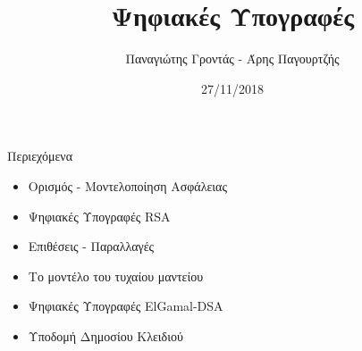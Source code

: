 \documentclass{beamer}
\title{Ψηφιακές Υπογραφές}
\author{Παναγιώτης Γροντάς - Άρης Παγουρτζής}
\date{27/11/2018}
\institute{ΕΜΠ - Κρυπτογραφία (2018-2019)}
\begin{document}
\newcommand{\xor}{ \oplus }
\newcommand{\msg}{ \mathtt{M} }
\newcommand{\KEY}{ \mathtt{K} }
\newcommand{\CPH}{ \mathtt{C} }
\newcommand{\keygen}{\mathtt{KeyGen}}
\newcommand{\enc}{\mathtt{Encrypt}}
\newcommand{\dec}{\mathtt{Decrypt}}
\newcommand{\sign}{\mathtt{Sign}}
\newcommand{\verify}{\mathtt{Verify}}
\newcommand{\adv}{$\mathcal{A}$ }
\newcommand{\Hash}{\mathcal{H} }
\newcommand{\advb}{$\mathcal{B}$ }
\newcommand{\chal}{$\mathcal{C}$ }
\newcommand{\cs}{$\mathcal{CS}$}
\newcommand{\Zed}{\mathbb{Z}} 
\newcommand{\zns}{\mathbb{Z}^*_n}
\newcommand{\zs}[1]{\mathbb{Z}^*_{#1}}

\newcommand{\green}[1]{\textcolor{teal}{#1}}
\newcommand{\Green}[1]{\textcolor{Teal}{#1}}
\newcommand{\ForestGreen}[1]{\textcolor{ForestGreen}{#1}}
\newcommand{\blue}[1]{\textcolor{blue}{#1}}
\newcommand{\magenta}[1]{\textcolor{magenta}{#1}}
\newcommand{\cyan}[1]{\textcolor{cyan}{#1}}

\newcommand{\twopartdef}[4]
{ 
		\begin{cases}
			#1 , #2 \\
			#3 , #4
		\end{cases} 
}
\begin{frame}
\titlepage
\end{frame}

\begin{frame}{Περιεχόμενα}
\begin{itemize}
\item Ορισμός - Μοντελοποίηση Ασφάλειας
\item Ψηφιακές Υπογραφές RSA
\item Επιθέσεις - Παραλλαγές
\item Το μοντέλο του τυχαίου μαντείου
\item Ψηφιακές Υπογραφές ElGamal-DSA
\item Υποδομή Δημοσίου Κλειδιού
\end{itemize}
\end{frame}
\end{document}
